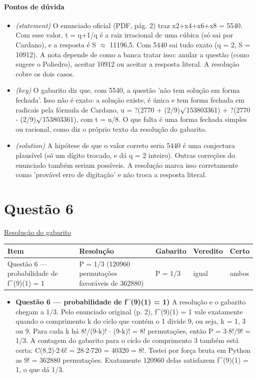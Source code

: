 \documentclass{article}%
\begin{document}
\paragraph{Pontos de dúvida}%
\begin{itemize}%
\item%
\textit{(statement)} O enunciado oficial (PDF, pág. 2) traz x2+x4+x6+x8 = 5540. Com esse valor, t = q+1/q é a raiz irracional de uma cúbica (só sai por Cardano), e a resposta é S $\approx$ 11196,5. Com 5440 sai tudo exato (q = 2, S = 10912). A nota depende de como a banca tratar isso: anular a questão (como sugere o Poliedro), aceitar 10912 ou aceitar a resposta literal. A resolução cobre os dois casos.%
\item%
\textit{(key)} O gabarito diz que, com 5540, a questão 'não tem solução em forma fechada'. Isso não é exato: a solução existe, é única e tem forma fechada em radicais pela fórmula de Cardano, u = ?(2770 + (2/9)$\surd$153803361) + ?(2770 - (2/9)$\surd$153803361), com t = u/8. O que falta é uma forma fechada simples ou racional, como diz o próprio texto da resolução do gabarito.%
\item%
\textit{(solution)} A hipótese de que o valor correto seria 5440 é uma conjectura plausível (só um dígito trocado, e dá q = 2 inteiro). Outras correções do enunciado também seriam possíveis. A resolução marca isso corretamente como 'provável erro de digitação' e não troca a resposta literal.%
\end{itemize}%
\section*{Questão 6}%
\href{https://poliedroresolve.sistemapoliedro.com.br/vestibulares/ime/2027/ime-2-fase-dia-1-26-10-2026-2-fase-dia-1/dissertativa-6-matematica-2-fase-dia-1-ime-2027}{Resolução do gabarito}\par\smallskip%
\begin{longtable}{@{}p{} p{} p{} p{} p{}@{}}\toprule Item & Resolução & Gabarito & Veredito & Certo \\ \midrule
Questão 6 --- probabilidade de f\^{}(9)(1) = 1 & P = 1/3 (120960 permutações favoráveis de 362880) & P = 1/3 & igual & ambos \\
\bottomrule\end{longtable}%
\begin{itemize}%
\item%
\textbf{Questão 6 --- probabilidade de f\^{}(9)(1) = 1)} A resolução e o gabarito chegam a 1/3. Pelo enunciado original (p. 2), f\^{}(9)(1) = 1 vale exatamente quando o comprimento k do ciclo que contém o 1 divide 9, ou seja, k = 1, 3 ou 9. Para cada k há 8!/(9-k)! $\cdot$ (9-k)! = 8! permutações, então P = 3$\cdot$8!/9! = 1/3. A contagem do gabarito para o ciclo de comprimento 3 também está certa: C(8,2)$\cdot$2$\cdot$6! = 28$\cdot$2$\cdot$720 = 40320 = 8!. Testei por força bruta em Python as 9! = 362880 permutações. Exatamente 120960 delas satisfazem f\^{}(9)(1) = 1, o que dá 1/3.%
\end{itemize}%
\end{document}
